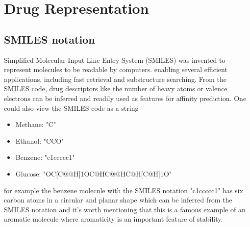\documentclass[11pt, a4paper]{article}
\begin{document}
\section{Drug Representation}
    \subsection{SMILES notation}
    Simplified Molecular Input Line Entry System (SMILES) was invented to represent molecules to be readable by computers.
    enabling several efficient applications, including
    fast retrieval and substructure searching. From the SMILES code,
    drug descriptors like the number of heavy atoms or valence electrons
    can be inferred and readily used as features for affinity prediction.
    One could also view the SMILES code as a string
    \begin{itemize}
        \item Methane: "C"
        \item Ethanol: "CCO"
        \item Benzene: "c1ccccc1" 
        \item Glucose: "OC[C@@H]1OC@HC@@HC@H[C@H]1O"     
    \end{itemize}
    for example the benzene molecule with the SMILES notation "c1ccccc1" has six carbon atoms in a circular and planar shape which can be inferred from the SMILES notation and 
    it's worth mentioning that this is a famous example of an aromatic molecule where aromaticity is an important feature of stability.
\end{document}
